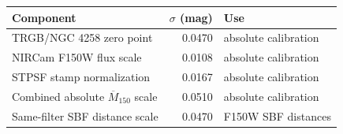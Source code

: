 \begin{tabular}{lrp{4.5cm}}
\toprule
Component & $\sigma$ (mag) & Use \\
\midrule
TRGB/NGC 4258 zero point & 0.0470 & absolute calibration \\
NIRCam F150W flux scale & 0.0108 & absolute calibration \\
STPSF stamp normalization & 0.0167 & absolute calibration \\
Combined absolute $\overline M_{150}$ scale & 0.0510 & absolute calibration \\
Same-filter SBF distance scale & 0.0470 & F150W SBF distances \\
\bottomrule
\end{tabular}
